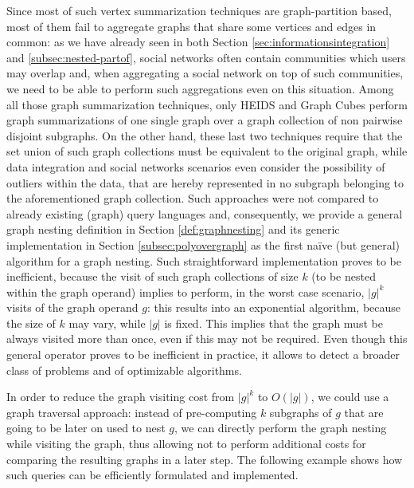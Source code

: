 Since most of such vertex summarization techniques are graph-partition based, most of them fail to aggregate graphs that share some vertices and edges in common: as we have already seen in both Section \vref{sec:informationsintegration} and \vref{subsec:nested-partof}, social networks often contain communities which users may overlap and, when aggregating a social network on top of such communities, we need to be able to perform such aggregations even on this situation. Among all those graph summarization techniques, only HEIDS \cite{ChengJQ16} and Graph Cubes \cite{Zhao11} perform graph summarizations of one single graph over a graph collection of non pairwise disjoint subgraphs. On the other hand, these last two techniques require that the set union of such graph collections must be equivalent to the original graph, while data integration and social networks scenarios even consider the possibility of outliers within the data, that are hereby represented in no subgraph belonging to the aforementioned graph collection. %
Such approaches were not compared to already existing (graph) query languages and, consequently, we provide a general graph nesting definition in Section \vref{def:graphnesting} and its generic implementation in Section \vref{subsec:polyovergraph} as the first naïve (but general) algorithm for a graph nesting. Such straightforward implementation  proves to be inefficient, because the visit of such graph collections of size $k$ (to be nested within the graph operand) implies to perform, in the worst case scenario, $|g|^k$ visits of the graph operand $g$: this results into an exponential algorithm, because the size of $k$ may vary, while $|g|$ is fixed. This implies that the graph must be always visited more than once, even if this may not be required. Even though this general operator proves to be inefficient in practice, it allows to detect a broader class of problems and of optimizable algorithms.

In order to reduce the graph visiting cost from $|g|^k$ to $O(|g|)$, we could use a graph traversal approach: instead of pre-computing $k$ subgraphs of $g$ that are going to be later on used to nest $g$, we can directly perform the graph nesting while visiting the graph, thus allowing  not to perform additional costs for comparing the resulting graphs in a later step. The following example shows how such queries can be efficiently formulated and implemented.

